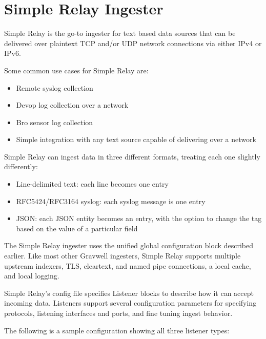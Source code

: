 \section{Simple Relay Ingester}
Simple Relay is the go-to ingester for text based data sources that can
be delivered over plaintext TCP and/or UDP network connections via
either IPv4 or IPv6.

Some common use cases for Simple Relay are:

\begin{itemize}
\item
  Remote syslog collection
\item
  Devop log collection over a network
\item
  Bro sensor log collection
\item
  Simple integration with any text source capable of delivering over a
  network
\end{itemize}

Simple Relay can ingest data in three different formats, treating each
one slightly differently:

\begin{itemize}
\item
  Line-delimited text: each line becomes one entry
\item
  RFC5424/RFC3164 syslog: each syslog message is one entry
\item
  JSON: each JSON entity becomes an entry, with the option to change
  the tag based on the value of a particular field
\end{itemize}

The Simple Relay ingester uses the unified global configuration block
described earlier. Like most other Gravwell ingesters, Simple Relay
supports multiple upstream indexers, TLS, cleartext, and named pipe
connections, a local cache, and local logging.

Simple Relay's config file specifies Listener blocks to describe how it
can accept incoming data. Listeners support several configuration
parameters for specifying protocols, listening interfaces and ports, and
fine tuning ingest behavior.

The following is a sample configuration showing all three listener types:


